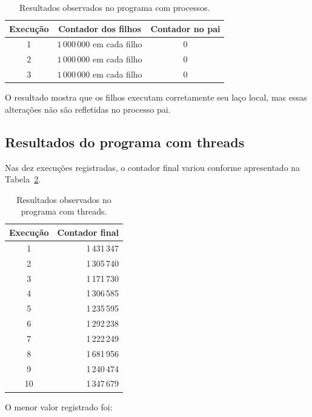 \begin{table}[htbp]
    \centering
    \caption{Resultados observados no programa com processos.}
    \label{tab:atvd03-processos-resultados}
    \begin{tabular}{c|c|c}
        \hline
        Execução & Contador dos filhos & Contador no pai \\
        \hline
        1 & \(1\,000\,000\) em cada filho & 0 \\
        2 & \(1\,000\,000\) em cada filho & 0 \\
        3 & \(1\,000\,000\) em cada filho & 0 \\
        \hline
    \end{tabular}
\end{table}

O resultado mostra que os filhos executam corretamente seu laço local, mas essas alterações não são refletidas no processo pai.

\subsection{Resultados do programa com threads}

Nas dez execuções registradas, o contador final variou conforme apresentado na Tabela~\ref{tab:atvd03-threads-resultados}.

\begin{table}[htbp]
    \centering
    \caption{Resultados observados no programa com threads.}
    \label{tab:atvd03-threads-resultados}
    \begin{tabular}{c|r}
        \hline
        Execução & Contador final \\
        \hline
        1 & 1\,431\,347 \\
        2 & 1\,305\,740 \\
        3 & 1\,171\,730 \\
        4 & 1\,306\,585 \\
        5 & 1\,235\,595 \\
        6 & 1\,292\,238 \\
        7 & 1\,222\,249 \\
        8 & 1\,681\,956 \\
        9 & 1\,240\,474 \\
        10 & 1\,347\,679 \\
        \hline
    \end{tabular}
\end{table}

O menor valor registrado foi:

